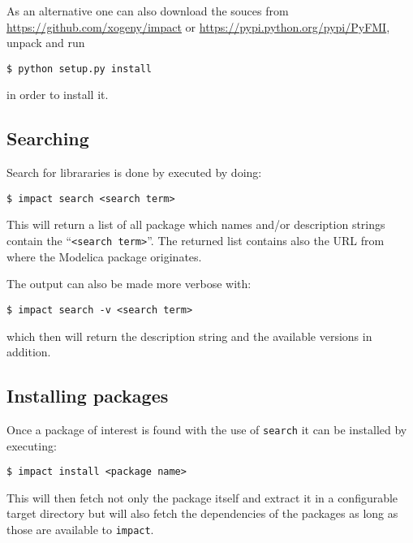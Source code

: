 \documentclass[11pt,a4paper,twocolumn]{article}
\newcommand{\impact}{\texttt{impact}} %
\newcommand{\code}[1]{\texttt{#1}} %
\begin{document}
As an alternative one can also download the souces from
\url{https://github.com/xogeny/impact} or
\url{https://pypi.python.org/pypi/PyFMI},
unpack and run
\begin{verbatim}
$ python setup.py install
\end{verbatim}

in order to install it.




\subsection{Searching} %
\label{cmd:search}

Search for librararies is done by executed by doing:

\begin{verbatim}
$ impact search <search term>
\end{verbatim}

This will return a list of all package which names and/or description strings
contain the ``\code{<search term>}''. The returned list contains also the URL
from where the Modelica package originates.

The output can also be made more verbose with:
\begin{verbatim}
$ impact search -v <search term>
\end{verbatim}
which then will return the description string and the available versions
in addition.

\subsection{Installing packages} %
\label{cmd:install-pkg}
Once a package of interest is found with the use of \code{search} it can
be installed by executing:
\begin{verbatim}
$ impact install <package name>
\end{verbatim}
This will then fetch not only the package itself and extract it in a
configurable target directory but will also fetch the dependencies of
the packages as long as those are available to \impact.
\end{document}
